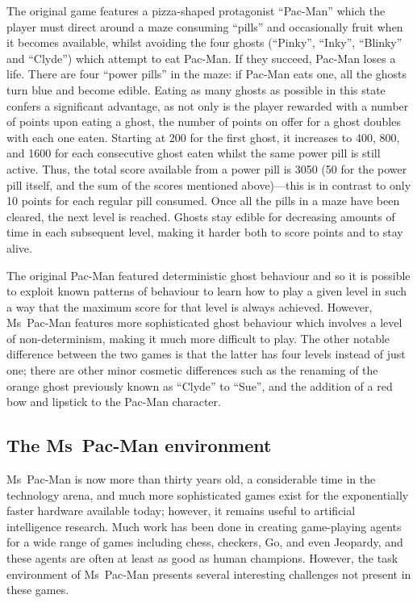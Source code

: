 The original game features a pizza-shaped protagonist ``Pac-Man'' which the player must direct around a maze consuming ``pills'' and occasionally fruit when it becomes available, whilst avoiding the four ghosts (``Pinky'', ``Inky'', ``Blinky'' and ``Clyde'') which attempt to eat Pac-Man.  If they succeed, Pac-Man loses a life.  There are four ``power pills'' in the maze: if Pac-Man eats one, all the ghosts turn blue and become edible.  Eating as many ghosts as possible in this state confers a significant advantage, as not only is the player rewarded with a number of points upon eating a ghost, the number of points on offer for a ghost doubles with each one eaten.  Starting at 200 for the first ghost, it increases to 400, 800, and 1600 for each consecutive ghost eaten whilst the same power pill is still active.  Thus, the total score available from a power pill is 3050 (50 for the power pill itself, and the sum of the scores mentioned above)---this is in contrast to only 10 points for each regular pill consumed.  Once all the pills in a maze have been cleared, the next level is reached.  Ghosts stay edible for decreasing amounts of time in each subsequent level, making it harder both to score points and to stay alive.

The original Pac-Man featured deterministic ghost behaviour and so it is possible to exploit known patterns of behaviour to learn how to play a given level in such a way that the maximum score for that level is always achieved.  However, Ms~Pac-Man features more sophisticated ghost behaviour which involves a level of non-determinism, making it much more difficult to play.  The other notable difference between the two games is that the latter has four levels instead of just one; there are other minor cosmetic differences such as the renaming of the orange ghost previously known as ``Clyde'' to ``Sue'', and the addition of a red bow and lipstick to the Pac-Man character.

\subsection{The Ms~Pac-Man environment}

Ms~Pac-Man is now more than thirty years old, a considerable time in the technology arena, and much more sophisticated games exist for the exponentially faster hardware available today; however, it remains useful to artificial intelligence research.  Much work has been done in creating game-playing agents for a wide range of games including chess, checkers, Go, and even Jeopardy, and these agents are often at least as good as human champions.  However, the task environment \cite[pp. 42--44]{RussellNorvig} of Ms~Pac-Man presents several interesting challenges not present in these games.

